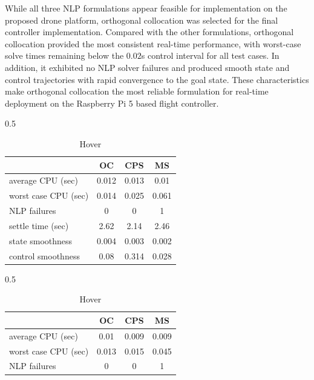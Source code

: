 \documentclass[conf]{new-aiaa}
\begin{document}
	While all three NLP formulations appear feasible for implementation on the proposed drone platform, orthogonal collocation was selected for the final controller implementation. Compared with the other formulations, orthogonal collocation provided the most consistent real-time performance, with worst-case solve times remaining below the $0.02$s control interval for all test cases. In addition, it exhibited no NLP solver failures and produced smooth state and control trajectories with rapid convergence to the goal state. These characteristics make orthogonal collocation the most reliable formulation for real-time deployment on the Raspberry Pi 5 based flight controller.
		

	
	\begin{table}[ht]
		\centering
		\begin{subtable}[b]{0.5\textwidth}
			\centering
			\begin{tabular}{ | l | c | c | c | } 
				\hline
				& OC & CPS & MS  \\
				\hline
				average CPU (sec) &            0.012        &        0.013         &        0.01  \\ 
				worst case CPU (sec)  &    0.014           &     0.025             &   0.061    \\  
				NLP failures &     0        &            0               &     1  \\
				settle time   (sec) &       2.62          &       2.14       &          2.46  \\ 
				state smoothness &        0.004        &        0.003   &             0.002   \\
				control smoothness &       0.08          &      0.314      &          0.028   \\
				\hline
			\end{tabular}
			\caption{Hover}
			\label{table1}
		\end{subtable}
		\hfill
		\begin{subtable}[b]{0.5\textwidth}
			\centering
			\begin{tabular}{ | l | c | c | c | } 
				\hline
				& OC & CPS & MS  \\
				\hline
				average CPU (sec) &           0.01         &       0.009      &          0.009  \\ 
				worst case CPU (sec)  &  0.013           &     0.015         &       0.045    \\  
				NLP failures &     0         &           0           &         1   \\

\end{tabular}
\end{subtable}
\end{table}
\end{document}
